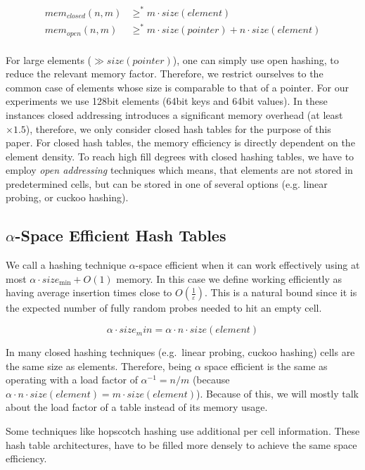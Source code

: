 \documentclass[a4paper,UKenglish]{lipics-v2016}
\begin{document}
\begin{align*}
  mem_{closed}(n,m) &\geq^* m\cdot size(element)\\
  mem_{open}  (n,m) &\geq^* m\cdot size(pointer) + n\cdot size(element)\\
\end{align*}

For large elements ($\gg size(pointer)$), one can simply use open
hashing, to reduce the relevant memory factor.  Therefore, we restrict
ourselves to the common case of elements whose size is comparable to
that of a pointer.  For our experiments we use 128bit elements (64bit
keys and 64bit values).  In these instances closed addressing
introduces a significant memory overhead (at least $\times1.5$),
therefore, we only consider closed hash tables for the purpose of this
paper. For closed hash tables, the memory efficiency is directly
dependent on the element density.  To reach high fill degrees with
closed hashing tables, we have to employ \emph{open addressing}
techniques which means, that elements are not stored in predetermined
cells, but can be stored in one of several options (e.g. linear
probing, or cuckoo hashing).

\subsection{$\alpha$-Space Efficient Hash Tables}
\label{sec:pre_staticspace}
We call a hashing technique $\alpha$-space efficient when it can work
effectively using at most $\alpha \cdot size_{\min} + O(1)$ memory. In
this case we define working efficiently as having average insertion
times close to $O(\frac{1}{\varepsilon})$. This is a natural bound
since it is the expected number of fully random probes needed to hit
an empty cell.

\[\alpha \cdot size_min = \alpha\cdot n\cdot size(element)\]

In many closed hashing techniques (e.g.~linear probing, cuckoo
hashing) cells are the same size as elements. Therefore, being
$\alpha$ space efficient is the same as operating with a load factor
of $\alpha^{-1} = n/m$ (because $\alpha\cdot n \cdot size(element) = m\cdot
size(element)$).  Because of this, we will mostly talk about the load
factor of a table instead of its memory usage.

Some techniques like hopscotch hashing use additional per cell
information.  These hash table architectures, have to be filled more
densely to achieve the same space efficiency.
\end{document}
